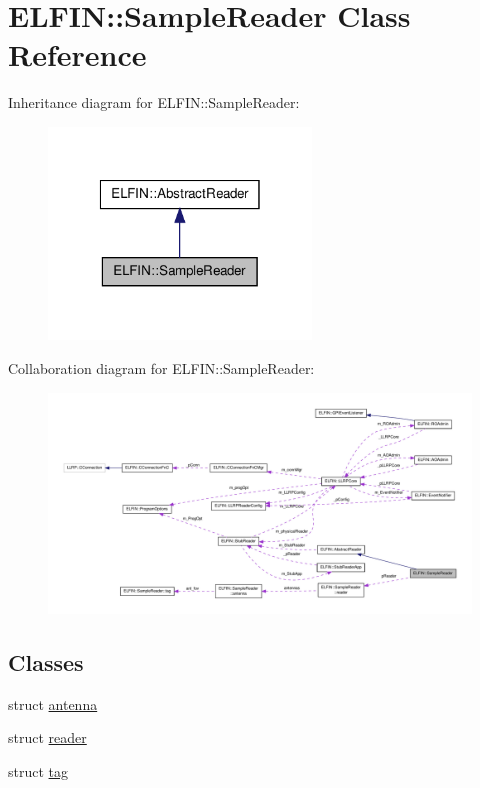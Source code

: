 \hypertarget{class_e_l_f_i_n_1_1_sample_reader}{\section{E\-L\-F\-I\-N\-:\-:Sample\-Reader Class Reference}
\label{class_e_l_f_i_n_1_1_sample_reader}
}


Inheritance diagram for E\-L\-F\-I\-N\-:\-:Sample\-Reader\-:
\nopagebreak
\begin{figure}[H]
\begin{center}
\leavevmode
\includegraphics[width=198pt]{class_e_l_f_i_n_1_1_sample_reader__inherit__graph}
\end{center}
\end{figure}


Collaboration diagram for E\-L\-F\-I\-N\-:\-:Sample\-Reader\-:
\nopagebreak
\begin{figure}[H]
\begin{center}
\leavevmode
\includegraphics[width=350pt]{class_e_l_f_i_n_1_1_sample_reader__coll__graph}
\end{center}
\end{figure}
\subsection*{Classes}
\begin{DoxyCompactItemize}
\item 
struct \hyperlink{struct_e_l_f_i_n_1_1_sample_reader_1_1antenna}{antenna}
\item 
struct \hyperlink{struct_e_l_f_i_n_1_1_sample_reader_1_1reader}{reader}
\item 
struct \hyperlink{struct_e_l_f_i_n_1_1_sample_reader_1_1tag}{tag}
\end{DoxyCompactItemize}
